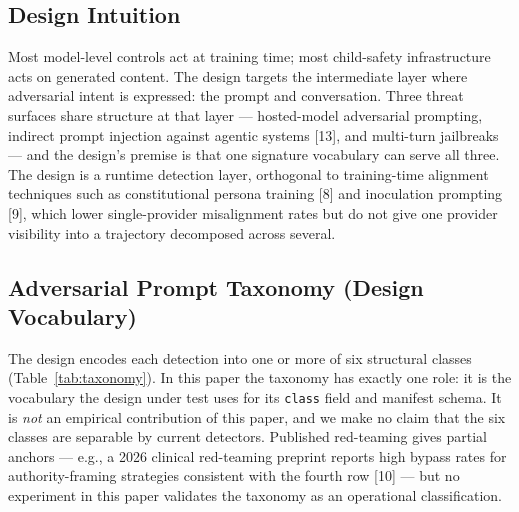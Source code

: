 \documentclass[11pt]{article}
\begin{document}
\subsection{Design Intuition}
\label{sec:layer}
Most model-level controls act at training time; most child-safety infrastructure acts on generated content. The design targets the intermediate layer where adversarial intent is expressed: the prompt and conversation. Three threat surfaces share structure at that layer --- hosted-model adversarial prompting, indirect prompt injection against agentic systems [13], and multi-turn jailbreaks --- and the design's premise is that one signature vocabulary can serve all three. The design is a runtime detection layer, orthogonal to training-time alignment techniques such as constitutional persona training [8] and inoculation prompting [9], which lower single-provider misalignment rates but do not give one provider visibility into a trajectory decomposed across several.

\subsection{Adversarial Prompt Taxonomy (Design Vocabulary)}
\label{sec:taxonomy}

The design encodes each detection into one or more of six structural classes (Table~\ref{tab:taxonomy}). In this paper the taxonomy has exactly one role: it is the vocabulary the design under test uses for its \texttt{class} field and manifest schema. It is \emph{not} an empirical contribution of this paper, and we make no claim that the six classes are separable by current detectors. Published red-teaming gives partial anchors --- e.g., a 2026 clinical red-teaming preprint reports high bypass rates for authority-framing strategies consistent with the fourth row [10] --- but no experiment in this paper validates the taxonomy as an operational classification.
\end{document}
